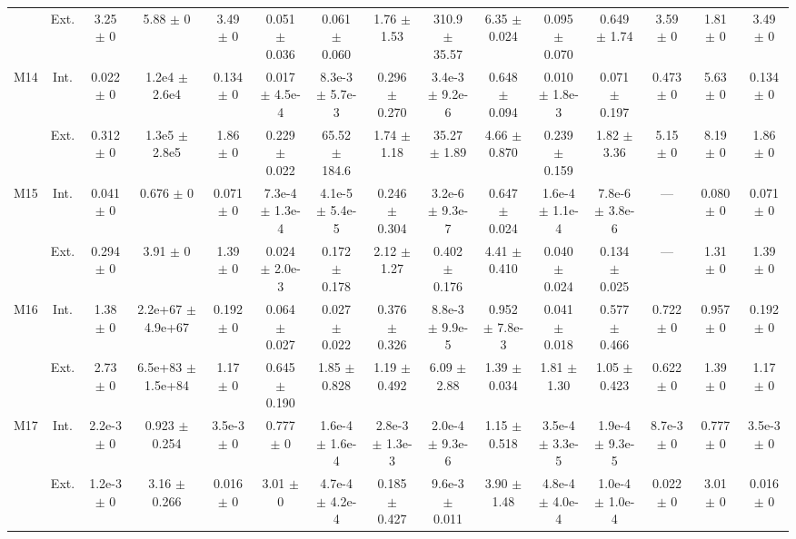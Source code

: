 \begin{table}[htbp]
{\begin{tabular}{@{}ccccccccccccccc@{}}
 & Ext. & 3.25 $\pm$ 0 & 5.88 $\pm$ 0 & 3.49 $\pm$ 0 & 0.051 $\pm$ 0.036 & 0.061 $\pm$ 0.060 & 1.76 $\pm$ 1.53 & 310.9 $\pm$ 35.57 & 6.35 $\pm$ 0.024 & 0.095 $\pm$ 0.070 & 0.649 $\pm$ 1.74 & 3.59 $\pm$ 0 & 1.81 $\pm$ 0 & 3.49 $\pm$ 0 \\
\cline{2-15}
\multirow{2}{*}{M14} & Int. & 0.022 $\pm$ 0 & 1.2e4 $\pm$ 2.6e4 & 0.134 $\pm$ 0 & 0.017 $\pm$ 4.5e-4 & 8.3e-3 $\pm$ 5.7e-3 & 0.296 $\pm$ 0.270 & 3.4e-3 $\pm$ 9.2e-6 & 0.648 $\pm$ 0.094 & 0.010 $\pm$ 1.8e-3 & 0.071 $\pm$ 0.197 & 0.473 $\pm$ 0 & 5.63 $\pm$ 0 & 0.134 $\pm$ 0 \\
 & Ext. & 0.312 $\pm$ 0 & 1.3e5 $\pm$ 2.8e5 & 1.86 $\pm$ 0 & 0.229 $\pm$ 0.022 & 65.52 $\pm$ 184.6 & 1.74 $\pm$ 1.18 & 35.27 $\pm$ 1.89 & 4.66 $\pm$ 0.870 & 0.239 $\pm$ 0.159 & 1.82 $\pm$ 3.36 & 5.15 $\pm$ 0 & 8.19 $\pm$ 0 & 1.86 $\pm$ 0 \\
\cline{2-15}
\multirow{2}{*}{M15} & Int. & 0.041 $\pm$ 0 & 0.676 $\pm$ 0 & 0.071 $\pm$ 0 & 7.3e-4 $\pm$ 1.3e-4 & 4.1e-5 $\pm$ 5.4e-5 & 0.246 $\pm$ 0.304 & 3.2e-6 $\pm$ 9.3e-7 & 0.647 $\pm$ 0.024 & 1.6e-4 $\pm$ 1.1e-4 & 7.8e-6 $\pm$ 3.8e-6 & --- & 0.080 $\pm$ 0 & 0.071 $\pm$ 0 \\
 & Ext. & 0.294 $\pm$ 0 & 3.91 $\pm$ 0 & 1.39 $\pm$ 0 & 0.024 $\pm$ 2.0e-3 & 0.172 $\pm$ 0.178 & 2.12 $\pm$ 1.27 & 0.402 $\pm$ 0.176 & 4.41 $\pm$ 0.410 & 0.040 $\pm$ 0.024 & 0.134 $\pm$ 0.025 & --- & 1.31 $\pm$ 0 & 1.39 $\pm$ 0 \\
\cline{2-15}
\multirow{2}{*}{M16} & Int. & 1.38 $\pm$ 0 & 2.2e+67 $\pm$ 4.9e+67 & 0.192 $\pm$ 0 & 0.064 $\pm$ 0.027 & 0.027 $\pm$ 0.022 & 0.376 $\pm$ 0.326 & 8.8e-3 $\pm$ 9.9e-5 & 0.952 $\pm$ 7.8e-3 & 0.041 $\pm$ 0.018 & 0.577 $\pm$ 0.466 & 0.722 $\pm$ 0 & 0.957 $\pm$ 0 & 0.192 $\pm$ 0 \\
 & Ext. & 2.73 $\pm$ 0 & 6.5e+83 $\pm$ 1.5e+84 & 1.17 $\pm$ 0 & 0.645 $\pm$ 0.190 & 1.85 $\pm$ 0.828 & 1.19 $\pm$ 0.492 & 6.09 $\pm$ 2.88 & 1.39 $\pm$ 0.034 & 1.81 $\pm$ 1.30 & 1.05 $\pm$ 0.423 & 0.622 $\pm$ 0 & 1.39 $\pm$ 0 & 1.17 $\pm$ 0 \\
\cline{2-15}
\multirow{2}{*}{M17} & Int. & 2.2e-3 $\pm$ 0 & 0.923 $\pm$ 0.254 & 3.5e-3 $\pm$ 0 & 0.777 $\pm$ 0 & 1.6e-4 $\pm$ 1.6e-4 & 2.8e-3 $\pm$ 1.3e-3 & 2.0e-4 $\pm$ 9.3e-6 & 1.15 $\pm$ 0.518 & 3.5e-4 $\pm$ 3.3e-5 & 1.9e-4 $\pm$ 9.3e-5 & 8.7e-3 $\pm$ 0 & 0.777 $\pm$ 0 & 3.5e-3 $\pm$ 0 \\
 & Ext. & 1.2e-3 $\pm$ 0 & 3.16 $\pm$ 0.266 & 0.016 $\pm$ 0 & 3.01 $\pm$ 0 & 4.7e-4 $\pm$ 4.2e-4 & 0.185 $\pm$ 0.427 & 9.6e-3 $\pm$ 0.011 & 3.90 $\pm$ 1.48 & 4.8e-4 $\pm$ 4.0e-4 & 1.0e-4 $\pm$ 1.0e-4 & 0.022 $\pm$ 0 & 3.01 $\pm$ 0 & 0.016 $\pm$ 0 \\

\end{tabular}}
\end{table}
